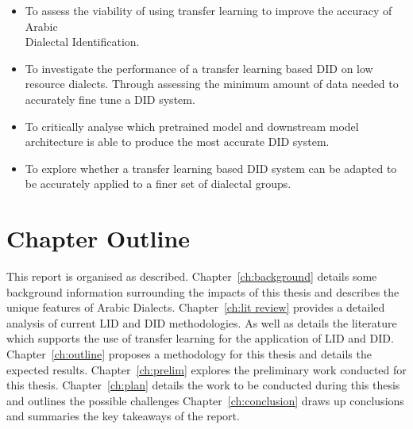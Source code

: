 \begin{itemize}
    \item To assess the viability of using transfer learning to improve the accuracy of Arabic \\Dialectal Identification. 
    \item To investigate the performance of a transfer learning based DID on low resource dialects. Through assessing the minimum amount of data needed to accurately fine tune a DID system.
    \item To critically analyse which pretrained model and downstream model architecture is able to produce the most accurate DID system. 
    \item To explore whether a transfer learning based DID system can be adapted to be accurately applied to a finer set of dialectal groups. 
\end{itemize}

\section{Chapter Outline}
This report is organised as described. 
Chapter~\ref{ch:background} details some background information surrounding the impacts of this thesis and describes the unique features of Arabic Dialects. 
Chapter~\ref{ch:lit review} provides a detailed analysis of current LID and DID methodologies. As well as 
details the literature which supports the use of transfer learning for the application of LID and DID. 
Chapter~\ref{ch:outline} proposes a methodology for this thesis and details the expected results.
Chapter~\ref{ch:prelim} explores the preliminary work conducted for this thesis. 
Chapter~\ref{ch:plan} details the work to be conducted during this thesis and outlines the possible challenges
Chapter~\ref{ch:conclusion} draws up conclusions and summaries the key takeaways of the report. 

